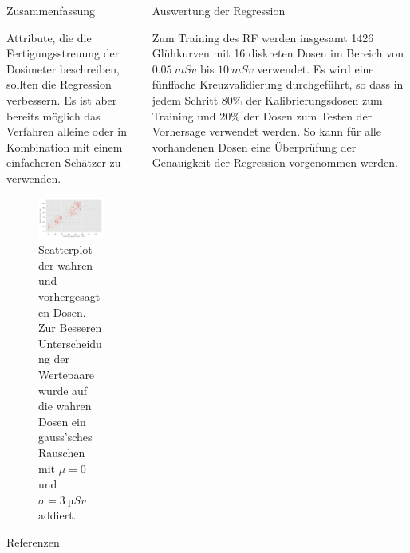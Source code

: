 \documentclass[20pt]{beamer}
\begin{document}
\begin{columns}[t, onlytextwidth]
\begin{column}{0.666\textwidth}
\begin{block}{Zusammenfassung}
\begin{multicols}{2}
                  \begin{large}
            Attribute, die die Fertigungsstreuung der Dosimeter beschreiben, sollten die Regression verbessern.
            Es ist aber bereits möglich das Verfahren alleine oder in Kombination mit einem einfacheren Schätzer zu verwenden.
                  \end{large}
          \begin{figure}
              \includegraphics[width=\linewidth]{./python/scatter.pdf}
              \caption{Scatterplot der wahren und vorhergesagten Dosen. Zur Besseren Unterscheidung der Wertepaare wurde auf die wahren Dosen ein gauss'sches Rauschen mit $ \mu = 0$ und $\sigma = \SI{3}{µSv}$ addiert.}
              \label{scatter1}
          \end{figure}
          \end{multicols}
      \end{block}%
  \begin{block}[equal height group=bottom, fonttitle=\normalsize]{Referenzen}
      \nocite{*}\footnotesize%
      \printbibliography%
  \end{block}

    \end{column}

    \begin{column}{0.333\textwidth}%
      \begin{block}{Auswertung der Regression}%
                  \begin{large}
            Zum Training des RF werden insgesamt 1426 Glühkurven mit 16 diskreten Dosen im Bereich von $\SI{0.05}{mSv}$ bis $\SI{10}{mSv}$ verwendet. Es wird eine fünffache Kreuzvalidierung durchgeführt, so dass in jedem Schritt 80\% der Kalibrierungsdosen zum Training und 20\% der Dosen zum Testen der Vorhersage verwendet werden. So kann für alle vorhandenen Dosen eine Überprüfung der Genauigkeit der Regression vorgenommen werden. 
                  \end{large}


\end{block}
\end{column}
\end{columns}
\end{document}
